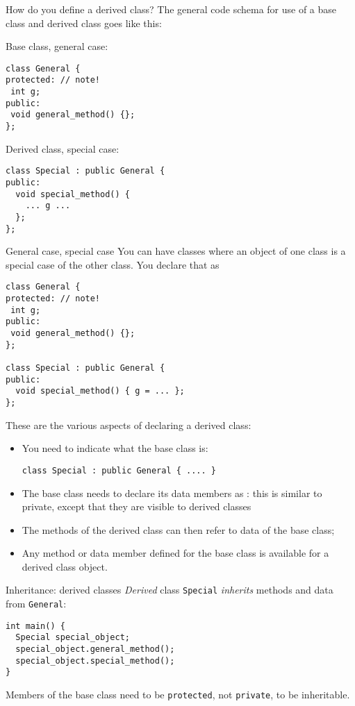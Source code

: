 How do you define a derived class?
The general code schema for use of a base class and derived class goes like this:

\begin{multicols}{2}
Base class, general case:
\begin{lstlisting}
class General {
protected: // note!
 int g;
public:
 void general_method() {};
};
\end{lstlisting}
\columnbreak
Derived class, special case:
\begin{lstlisting}
class Special : public General {
public:
  void special_method() {
    ... g ...
  };
};
\end{lstlisting}
\end{multicols}

\begin{slide}{General case, special case}
  \label{sl:obj-case}
  You can have classes where an object of one class is a special case of
  the other class. You declare that as
  \lstset{style=snippetcode}
\begin{lstlisting}
class General {
protected: // note!
 int g;
public:
 void general_method() {};
};

class Special : public General {
public:
  void special_method() { g = ... };
};
\end{lstlisting}
\end{slide}

These are the various aspects of declaring a derived class:
\begin{itemize}
\item You need to indicate what the base class is:
\begin{lstlisting}
class Special : public General { .... }
\end{lstlisting}
\item The base class needs to declare its data members as
  : this is similar to private, except that
  they are visible to derived classes
\item The methods of the derived class can then refer to data of the
  base class;
\item Any method or data member defined for the base class is available
  for a derived class object.
\end{itemize}

\begin{slide}{Inheritance: derived classes}
  \label{sl:obj-derive}
  \emph{Derived} class \lstinline{Special}
  \emph{inherits} methods and data from
   \lstinline{General}:
  \lstset{style=snippetcode}
\begin{lstlisting}
int main() {
  Special special_object;
  special_object.general_method();
  special_object.special_method();
}
\end{lstlisting}
Members of the base class need to be \lstinline{protected},
not \lstinline{private}, to be inheritable.
\end{slide}

